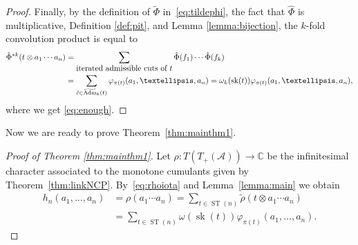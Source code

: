 \documentclass[11pt]{article}
\numberwithin{equation}{section}
\numberwithin{equation}{section}
\newcommand{\A}{\mathcal{A}}
\newcommand{\ST}{\operatorname{ST}}
\newcommand{\sk}{\operatorname{sk}}
\newcommand{\AdmT}{\widetilde{\operatorname{Adm}}}
\begin{document}
\begin{proof}
Finally, by the definition of $\tilde\Phi$ in~\eqref{eq:tildephi}, the fact that $\hat\Phi$ is multiplicative, Definition \ref{def:pit}, and Lemma \ref{lemma:bijection}, the $k$-fold convolution product is equal to
\begin{align*}
	\hat\Phi^{*k}(t\otimes a_1\cdots a_n)
	&= \sum_{\mbox{\tiny{iterated admissible cuts of $t$}}} \hat\Phi(f_1)\cdots \hat\Phi(f_k)\\
	&= \sum_{\tilde{c}\in \AdmT_k(t)} \varphi_{\pi(t)}(a_1,\dots,a_n)= \omega_k(\sk(t)) \varphi_{\pi(t)}(a_1,\dots,a_n),
\end{align*}
where we get \eqref{eq:enough}.
\end{proof}

Now we are ready to prove Theorem~\ref{thm:mainthm1}.

\begin{proof}[Proof of Theorem \ref{thm:mainthm1}]
Let $\rho\colon T(T_+(\A))\to\mathbb{C}$ be the infinitesimal character associated to the monotone cumulants given by Theorem~\ref{thm:linkNCP}. By~\eqref{eq:rhoiota} and Lemma~\ref{lemma:main} we obtain
\begin{align*}
h_n(a_1,\dots,a_n) &= \rho(a_1\cdots a_n)
= \sum_{t\in \ST(n)} \tilde\rho(t\otimes a_1\cdots a_n)
\\ &= \sum_{t\in \ST(n)} \omega(\sk(t))\varphi_{\pi(t)} (a_1,\dots,a_n).\tag*{\qed}
\end{align*}\renewcommand{\qed}{}
\end{proof}
\end{document}
